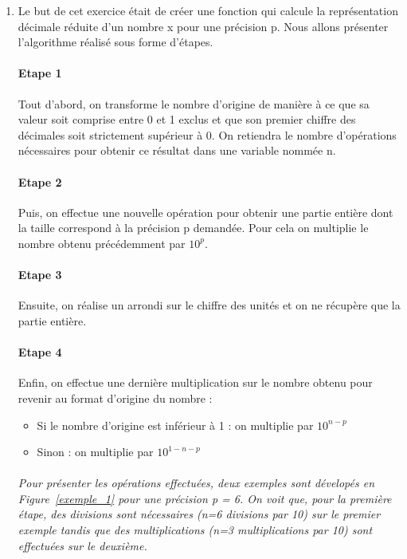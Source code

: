 \documentclass{article}
\begin{document}
\begin{enumerate}
    \item 
    Le but de cet exercice était de créer une fonction qui calcule la représentation décimale réduite d'un nombre x pour une précision p. Nous allons présenter l'algorithme réalisé sous forme d'étapes.
     
    \paragraph{Etape 1}
    Tout d’abord, on transforme le nombre d'origine de manière à ce que sa valeur soit comprise entre 0 et 1 exclus et que son premier chiffre des décimales soit strictement supérieur à 0. On retiendra le nombre d’opérations nécessaires pour obtenir ce résultat dans une variable nommée n.
    
    \paragraph{Etape 2}
    Puis, on effectue une nouvelle opération pour obtenir une partie entière dont la taille correspond à la précision p demandée. Pour cela on multiplie le nombre obtenu précédemment par $10^p$.
    
    \paragraph{Etape 3}
    Ensuite, on réalise un arrondi sur le chiffre des unités et on ne récupère que la partie entière.
    
    \paragraph{Etape 4}
    Enfin, on effectue une dernière multiplication sur le nombre obtenu pour revenir au format d’origine du nombre :
    \begin{itemize}
        \item Si le nombre d’origine est inférieur à 1 : on multiplie par $10^{n-p}$
        \item Sinon : on multiplie par $10^{1-n-p}$
    \end{itemize}
    
    \paragraph{}
    \textit{Pour présenter les opérations effectuées, deux exemples sont dévelopés en Figure~\ref{exemple_1} pour une précision p = 6. On voit que, pour la première étape, des divisions sont nécessaires (n=6 divisions par 10) sur le premier exemple tandis que des multiplications (n=3 multiplications par 10) sont effectuées sur le deuxième.}
    

\end{enumerate}
\end{document}
